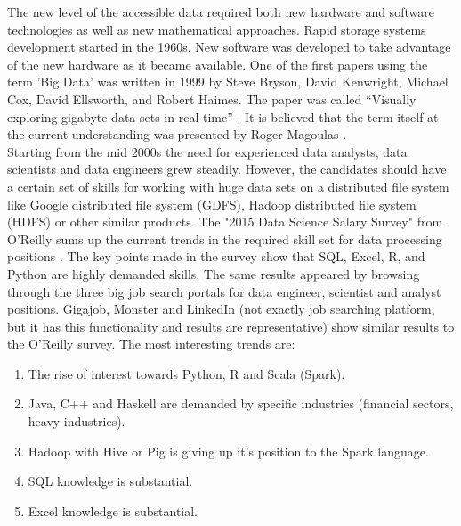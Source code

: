 \documentclass[
  twoside,
  11pt, a4paper,
  footinclude=true,
  headinclude=true,
  cleardoublepage=empty
]{scrreprt}
\begin{document}
        The new level of the accessible data required both new hardware and software technologies as well as new mathematical approaches. Rapid storage systems development started in the 1960s. New software was developed to take advantage of the new hardware as it became available. One of the first papers using the term 'Big Data' was written in 1999 by Steve Bryson, David Kenwright, Michael Cox, David Ellsworth, and Robert Haimes. The paper was called “Visually exploring gigabyte data sets in real time” \cite{article:GigabyteDataSets}. It is believed that the term itself at the current understanding was presented by Roger Magoulas \cite{linkedin:RogerMagoulas}.\\
        Starting from the mid 2000s the need for experienced data analysts, data scientists and data engineers grew steadily. However, the candidates should have a certain set of skills for working with huge data sets on a distributed file system like Google distributed file system (GDFS), Hadoop distributed file system (HDFS) or other similar products. The "2015 Data Science Salary Survey" from O'Reilly sums up the current trends in the required skill set for data processing positions \cite{oreilly:CentralSurvey}. The key points made in the survey show that SQL, Excel, R, and Python are highly demanded skills. The same results appeared by browsing through the three big job search portals for data engineer, scientist and analyst positions. Gigajob, Monster and LinkedIn (not exactly job searching  platform, but it has this functionality and results are representative) show similar results to the O'Reilly survey. The most interesting trends are:
        \begin{enumerate}
            \item The rise of interest towards Python, R and Scala (Spark).
            \item Java, C++ and Haskell are demanded by specific industries (financial sectors, heavy industries).
            \item Hadoop with Hive or Pig is giving up it's position to the Spark language.
            \item SQL knowledge is substantial.
            \item Excel knowledge is substantial.
        \end{enumerate}
\end{document}
